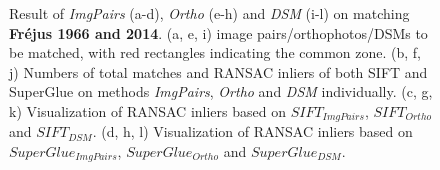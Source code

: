 \begin{figure}[htbp]
\begin{center}
{\begin{minipage}[t]{0.48\linewidth}
            \end{minipage}%
        }
        \caption{{\scriptsize Result of \textit{ImgPairs} (a-d), \textit{Ortho} (e-h) and \textit{DSM} (i-l) on matching \textbf{Fr{\'e}jus 1966 and 2014}. (a, e, i) image pairs/orthophotos/DSMs to be matched, with red rectangles indicating the common zone. (b, f, j) Numbers of total matches and RANSAC inliers of both SIFT and SuperGlue on methods \textit{ImgPairs}, \textit{Ortho} and \textit{DSM} individually. (c, g, k) Visualization of RANSAC inliers based on $SIFT_{ImgPairs}$, $SIFT_{Ortho}$ and $SIFT_{DSM}$. (d, h, l) Visualization of RANSAC inliers based on $SuperGlue_{ImgPairs}$, $SuperGlue_{Ortho}$ and $SuperGlue_{DSM}$.}}
        \label{MatchVizFrejus1966DSM}
    \end{center}
\end{figure} 



